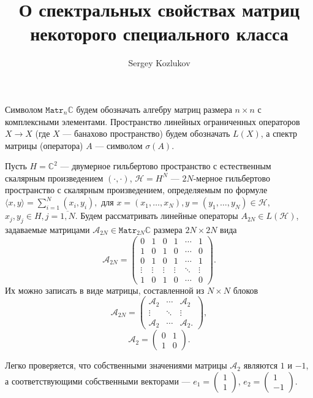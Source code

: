 \documentclass{article}
\title{О спектральных свойствах матриц некоторого специального класса}
\author{Sergey Kozlukov}
\begin{document}
\maketitle

Символом \( \mathtt{Matr}_{n}\mathbb{C} \) будем обозначать алгебру матриц размера \( n\times n\) с комплексными элементами.
Пространство линейных ограниченных операторов \( X\to X \) (где \( X \) --- банахово пространство)
будем обозначать \( L(X) \),
а спектр матрицы (оператора) \( A \) ---  символом \( \sigma(A) \).

Пусть \( H = \mathbb{C}^2 \) --- двумерное гильбертово пространство с естественным скалярным произведением \( (\cdot,\cdot) \),
\( \mathcal{H} = H^N \) --- \( 2N \)-мерное гильбертово пространство с скалярным произведением, определяемым по формуле
\( \langle x,y \rangle = \sum_{i=1}^N (x_i, y_i), \) для \( x = \left( x_1, \ldots, x_N \right), y = \left(y_1, \ldots, y_N \right) \in \mathcal{H}, \)
\( x_j, y_j \in H, j=\overline{1,N} \).
Будем рассматривать линейные операторы \( A_{2N}\in L(\mathcal{H}) \), задаваемые матрицами \( \mathcal{A}_{2N} \in \mathtt{Matr}_{2N}\mathbb{C} \) размера \( 2N\times 2N \) вида
\[ \mathcal{A}_{2N} =
    \begin{pmatrix}
    0 & 1 & 0 & 1 & \cdots &  1 \\
    1 & 0 & 1 & 0 & \cdots &  0 \\
    0 & 1 & 0 & 1 & \cdots &  1 \\
    \vdots & \vdots & \vdots & \vdots & \ddots & \vdots \\
    1 & 0 & 1 & 0 & \cdots & 0
    \end{pmatrix}. \]
Их можно записать в виде матрицы, составленной из \( N\times N \) блоков
\[ \mathcal{A}_{2N} =
    \begin{pmatrix}
        \mathcal{A}_2 & \cdots & \mathcal{A}_2 \\
        \vdots        & \ddots & \vdots \\
        \mathcal{A}_2 & \cdots & \mathcal{A}_2.
        \end{pmatrix}, \]
\[ \mathcal{A}_2 = \begin{pmatrix} 0 & 1 \\ 1 & 0 \end{pmatrix}. \]

Легко проверяется, что собственными значениями матрицы \( \mathcal{A}_2 \)
являются \( 1 \) и \( -1 \), а соответствующими собственными векторами --- 
\( e_1 = \begin{pmatrix}1 \\ 1\end{pmatrix} \),
\( e_2 = \begin{pmatrix}1 \\ -1\end{pmatrix} \).
\end{document}

